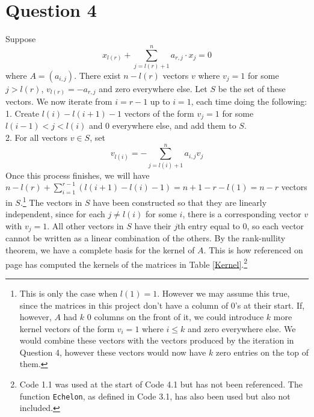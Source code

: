 \documentclass[10pt,a4paper,notitlepage]{article}
\begin{document}
\section*{\centering \large Question 4}
Suppose 
\begin{equation}
x_{l(r)}+\sum_{j=l(r)+1}^{n}a_{r,j}\cdot x_{j}=0
\end{equation}
where $A=(a_{i,j})$. There exist $n-l(r)$ vectors $v$ where $v_{j}=1$ for some $j>l(r)$, $v_{l(r)}=-a_{r,j}$ and zero everywhere else. Let $S$ be the set of these vectors. We now iterate from $i=r-1$ up to $i=1$, each time doing the following:\\
1. Create $l(i)-l(i+1)-1$ vectors of the form $v_{j}=1$ for some $l(i-1)<j<l(i)$ and 0 everywhere else, and add them to $S$.\\
2. For all vectors $v\in S$, set
\begin{equation}
v_{l(i)}=-\sum_{j=l(i)+1}^{n}a_{i,j}v_{j}
\end{equation}
Once this process finishes, we will have $n-l(r)+\sum_{i=1}^{r-1}(l(i+1)-l(i)-1)=n+1-r-l(1)=n-r$ vectors in $S$.\footnote{This is only the case when $l(1)=1$. However we may assume this true, since the matrices in this project don't have a column of 0's at their start. If, however,  $A$ had $k$ 0 columns on the front of it, we could introduce $k$ more kernel vectors of the form $v_{i}=1$ where $i\leq k$ and zero everywhere else. We would combine these vectors with the vectors produced by the iteration in Question 4, however these vectors would now have $k$ zero entries on the top of them.} The vectors in $S$ have been constructed so that they are linearly independent, since for each $j\neq l(i)$ for some $i$, there is a corresponding vector $v$ with $v_{j}=1$. All other vectors in $S$ have their $j$th entry equal to 0, so each vector cannot be written as a linear combination of the others. By the rank-nullity theorem, we have a complete basis for the kernel of $A$. This is how  referenced on page \pageref{subsec:Code 4.1} has computed the kernels of the matrices in Table \ref{Kernel}.\footnote{Code 1.1 was used at the start of Code 4.1 but has not been referenced. The function \texttt{Echelon}, as defined in Code 3.1, has also been used but also not included.}
\end{document}

